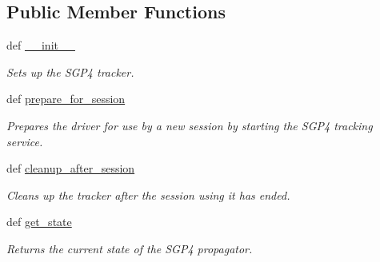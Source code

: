 \subsection*{Public Member Functions}
\begin{DoxyCompactItemize}
\item 
def \hyperlink{classhwm_1_1hardware_1_1devices_1_1drivers_1_1sgp4__tracker_1_1sgp4__tracker_1_1_s_g_p4___tracker_a277786ce0af746b1028fd9544cc50176}{\-\_\-\-\_\-init\-\_\-\-\_\-}
\begin{DoxyCompactList}\small\item\em Sets up the S\-G\-P4 tracker. \end{DoxyCompactList}\item 
def \hyperlink{classhwm_1_1hardware_1_1devices_1_1drivers_1_1sgp4__tracker_1_1sgp4__tracker_1_1_s_g_p4___tracker_a0a73c57d608e1070336d4edb4ddde5e6}{prepare\-\_\-for\-\_\-session}
\begin{DoxyCompactList}\small\item\em Prepares the driver for use by a new session by starting the S\-G\-P4 tracking service. \end{DoxyCompactList}\item 
def \hyperlink{classhwm_1_1hardware_1_1devices_1_1drivers_1_1sgp4__tracker_1_1sgp4__tracker_1_1_s_g_p4___tracker_a493be7a75656d5a9c35b863395cd2e55}{cleanup\-\_\-after\-\_\-session}
\begin{DoxyCompactList}\small\item\em Cleans up the tracker after the session using it has ended. \end{DoxyCompactList}\item 
def \hyperlink{classhwm_1_1hardware_1_1devices_1_1drivers_1_1sgp4__tracker_1_1sgp4__tracker_1_1_s_g_p4___tracker_a98ab8c9b65bfe5ed948159259015cada}{get\-\_\-state}
\begin{DoxyCompactList}\small\item\em Returns the current state of the S\-G\-P4 propagator. \end{DoxyCompactList}\end{DoxyCompactItemize}
